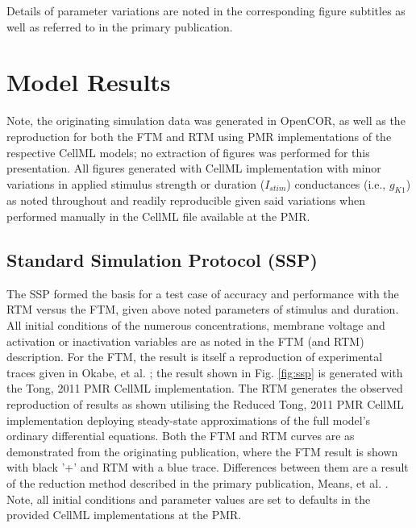 \documentclass[fleqn,10pt]{physiome}
\begin{document}
Details of parameter variations are noted in the corresponding figure subtitles as well as referred to in the primary publication. 

\section{Model Results}

Note, the originating simulation data was generated in OpenCOR, as well as the reproduction for both the FTM and RTM using PMR implementations of the respective CellML models; no extraction of figures was performed for this presentation. All figures generated with CellML implementation with minor variations in applied stimulus strength or duration ($I_{stim}$) conductances (i.e., $g_{K1}$) as noted throughout and readily reproducible given said variations when performed manually in the CellML file available at the PMR. 

\subsection{Standard Simulation Protocol (SSP)}

The SSP formed the basis for a test case of accuracy and performance with the RTM versus the FTM, given above noted parameters of stimulus and duration. All initial conditions of the numerous concentrations, membrane voltage and activation or inactivation variables are as noted in the FTM (and RTM) description. For the FTM, the result is itself a reproduction of experimental traces given in Okabe, et al. \citep{okabe1999}; the result shown  in Fig. \ref{fig:ssp} is generated with the Tong, 2011 PMR CellML implementation. The RTM generates the observed reproduction of results as shown utilising the Reduced Tong, 2011 PMR CellML implementation deploying steady-state approximations of the full model's ordinary differential equations. Both the FTM and RTM curves are as demonstrated from the originating publication, where the FTM result is shown with black '+' and RTM with a blue trace. Differences between them are a result of the reduction method described in the primary publication, Means, et al. \citep{means2022}. Note, all initial conditions and parameter values are set to defaults in the provided CellML implementations at the PMR.
\end{document}
